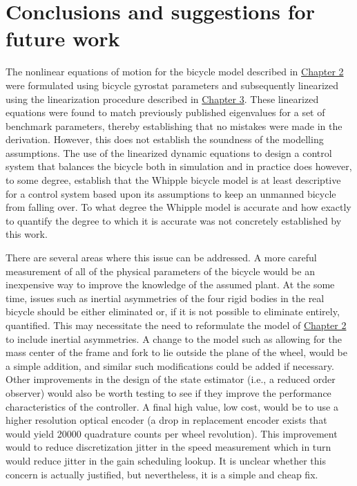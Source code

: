 \chapter{Conclusions and suggestions for future work}
The nonlinear equations of motion for the bicycle model described in
\hyperref[chapter2]{Chapter 2} were formulated using bicycle gyrostat
parameters and subsequently linearized using the linearization procedure
described in \hyperref[chapter3]{Chapter 3}. These linearized equations were
found to match previously published eigenvalues for a set of benchmark
parameters, thereby establishing that no mistakes were made in the derivation.
However, this does not establish the soundness of the modelling assumptions.
The use of the linearized dynamic equations to design a control system that
balances the bicycle both in simulation and in practice does however, to some
degree, establish that the Whipple bicycle model is at least descriptive for a
control system based upon its assumptions to keep an unmanned bicycle from
falling over. To what degree the Whipple model is accurate and how exactly to
quantify the degree to which it is accurate was not concretely established by
this work.

There are several areas where this issue can be addressed. A more careful
measurement of all of the physical parameters of the bicycle would be an
inexpensive way to improve the knowledge of the assumed plant. At the some
time, issues such as inertial asymmetries of the four rigid bodies in the real
bicycle should be either eliminated or, if it is not possible to eliminate
entirely, quantified. This may necessitate the need to reformulate the model of
\hyperref[chapter2]{Chapter 2} to include inertial asymmetries. A change to
the model such as allowing for the mass center of the frame and fork to lie
outside the plane of the wheel, would be a simple addition, and similar such
modifications could be added if necessary. Other improvements in the design of the
state estimator (i.e., a reduced order observer) would also be worth testing to
see if they improve the performance characteristics of the controller. A final
high value, low cost, would be to use a higher resolution optical encoder (a
drop in replacement encoder exists that would yield 20000 quadrature counts per
wheel revolution). This improvement would to reduce discretization jitter in
the speed measurement which in turn would reduce jitter in the gain scheduling
lookup. It is unclear whether this concern is actually justified, but
nevertheless, it is a simple and cheap fix.

